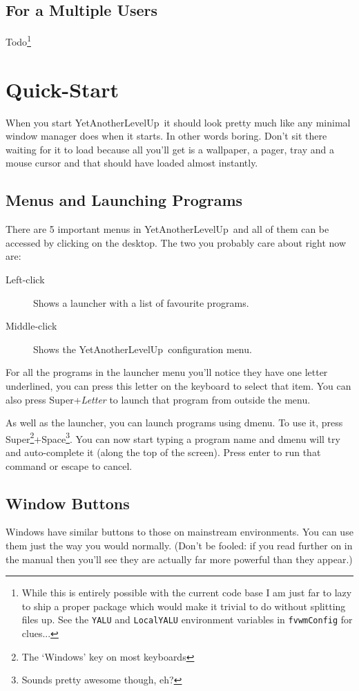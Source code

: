\documentclass[a4paper,11pt]{article}
\newcommand{\yalu}{YetAnotherLevelUp}
\begin{document}
		\subsection{For a Multiple Users}
			Todo\footnote{
				While this is entirely possible with the current code base I am just far
				to lazy to ship a proper package which would make it trivial to do
				without splitting files up. See the \texttt{YALU} and \texttt{LocalYALU}
				environment variables in \texttt{fvwmConfig} for clues...
			}
	
	\section{Quick-Start}
		When you start \yalu\ it should look pretty much like any minimal window
		manager does when it starts. In other words boring. Don't sit there waiting
		for it to load because all you'll get is a wallpaper, a pager, tray and a
		mouse cursor and that should have loaded almost instantly.
		
		\subsection{Menus and Launching Programs}
		There are 5 important menus in \yalu\ and all of them can be accessed by
		clicking on the desktop. The two you probably care about right now are:
		\begin{description}
			\item[Left-click] Shows a launcher with a list of favourite programs.
			\item[Middle-click] Shows the \yalu\ configuration menu.
		\end{description}
		
		For all the programs in the launcher menu you'll notice they have one letter
		underlined, you can press this letter on the keyboard
		to select that item. You can also press Super+\emph{Letter} to launch that
		program from outside the menu.
		
		As well as the launcher, you can launch programs using dmenu. To use it,
		press Super\footnote{The `Windows' key on most
		keyboards}+Space\footnote{Sounds pretty awesome though, eh?}. You can now
		start typing a program name and dmenu will try and auto-complete it (along
		the top of the screen). Press enter to run that command or escape to cancel.
		
		\subsection{Window Buttons}
		Windows have similar buttons to those on mainstream environments. You can
		use them just the way you would normally. (Don't be fooled: if you
		read further on in the manual then you'll see they are actually far more
		powerful than they appear.)
		
\end{document}
